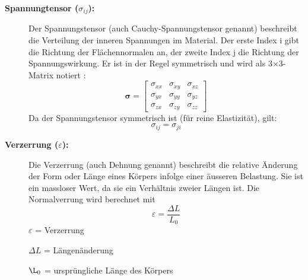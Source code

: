\begin{description}
	\item[\textbf{Spannungtensor ($\sigma_{ij}$):}] Der Spannungstensor (auch Cauchy-Spannungstensor genannt) beschreibt die Verteilung der inneren Spannungen im Material. 
	Der erste Index	i gibt die Richtung der Flächennormalen an, der zweite Index j die Richtung der Spannungswirkung. 
	Er ist in der Regel symmetrisch und wird als 3×3-Matrix notiert \cite{elastomechanik:Grundlagen_der_Elastizitaetstheorie}:
	\begin{equation}
	\boldsymbol{\sigma} =
	\begin{bmatrix}
		\sigma_{xx} & \sigma_{xy} & \sigma_{xz} \\
		\sigma_{yx} & \sigma_{yy} & \sigma_{yz} \\
		\sigma_{zx} & \sigma_{zy} & \sigma_{zz}
	\end{bmatrix}
	\end{equation}
	Da der Spannungstensor symmetrisch ist (für reine Elastizität), gilt:
	\begin{equation}
		\sigma_{ij} = 
		\sigma_{ji}
	\end{equation}
	\item[\textbf{Verzerrung ($\varepsilon$):}] Die Verzerrung (auch Dehnung genannt) beschreibt die relative Änderung der Form oder Länge eines Körpers infolge einer äusseren Belastung. 
	Sie ist ein massloser Wert, da sie ein Verhältnis zweier Längen ist.
	Die Normalverrung wird berechnet mit
	\begin{equation}
		\varepsilon 
		= \frac{\Delta L}{L_0}
	\end{equation}
	$\varepsilon$ = Verzerrung
	
	$\Delta L$ = Längenänderung
	
	$\L_0$ = ursprüngliche Länge des Körpers
	

\end{description}
